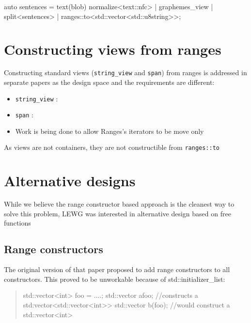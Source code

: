 \documentclass{wg21}
\newcommand{\cc}[1]{\texttt{#1}}
\begin{document}
\begin{codeblock}
    auto sentences =
        text(blob)
        normalize<text::nfc> |
        graphemes_view |
        split<sentences> | ranges::to<std::vector<std::u8string>>;
\end{codeblock}



\section{Constructing views from ranges}

Constructing standard views (\cc{string_view} and \cc{span}) from ranges is addressed in separate papers as
the design space and the requirements are different:

\begin{itemize}
	\item \cc{string_view} : \cite{P1391}
	\item  \cc{span}       : \cite{P1394}
	\item Work is being done to allow Ranges's iterators to be move only
\end{itemize}

As views are not containers, they are not constructible from \cc{ranges::to}


\section{Alternative designs}

While we believe the range constructor based approach is the cleanest way to solve this problem,
LEWG was interested in alternative design based on free functions

\subsection{Range constructors}

The original version of that paper proposed to add range constructors to all constructors.
This proved to be unworkable because of std::initializer_list:

\begin{quote}
	\begin{codeblock}
		std::vector<int> foo = ....;
		std::vector a{foo}; //constructs a std:vector<std::vector<int>>
		std::vector b(foo); //would construct a std::vector<int>
	\end{codeblock}
\end{quote}
\end{document}
